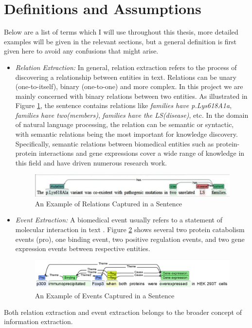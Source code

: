 \section{Definitions and Assumptions}\label{section1.2}%
Below are a list of terms which I will use throughout this thesis, more detailed examples will be given in the relevant sections, but a general definition is first given here to avoid any confusions that might arise.
\begin{itemize}
	\item \emph{Relation Extraction:} In general, relation extraction refers to the process of discovering a relationship between entities in text. Relations can be unary (one-to-itself), binary (one-to-one) and more complex. In this project we are mainly concerned with binary relations between two entities. As illustrated in Figure \ref{fig:Relations_Example}, the sentence contains relations like \emph{families have p.Lys618A1a}, \emph{families have two(members)}, \emph{families have the LS(disease)}, etc. In the domain of natural language processing, the relation can be semantic or syntactic, with semantic relations being the most important for knowledge discovery. Specifically, semantic relations between biomedical entities such as protein-protein interactions and gene expressions cover a wide range of knowledge in this field and have driven numerous research work.
	\begin{figure}
		\centering
		\includegraphics[width=\textwidth]{Relations_Example}
		\caption{An Example of Relations Captured in a Sentence}
		\label{fig:Relations_Example}   
	\end{figure}
	\item \emph{Event Extraction:} A biomedical event usually refers to a statement of molecular interaction in text \cite{bjorne2011generalizing}. Figure \ref{fig:Events_Example} shows several two protein catabolism events (pro), one binding event, two positive regulation events, and two gene expression events between respective entities.
	\begin{figure}
		\centering
		\includegraphics[width=\textwidth]{Events_Example}
		\caption{An Example of Events Captured in a Sentence}
		\label{fig:Events_Example}   
	\end{figure}
\end{itemize}
Both relation extraction and event extraction belongs to the broader concept of information extraction.

